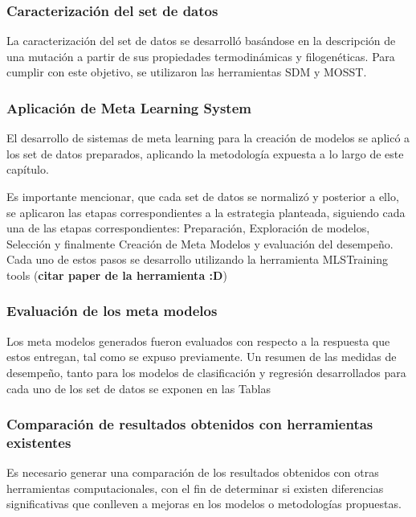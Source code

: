 \subsubsection{Caracterización del set de datos}

La caracterización del set de datos se desarrolló basándose en la descripción de una mutación a partir de sus propiedades termodinámicas y filogenéticas. Para cumplir con este objetivo, se utilizaron las herramientas SDM y MOSST.

\subsubsection{Aplicación de Meta Learning System}

El desarrollo de sistemas de meta learning para la creación de modelos se aplicó a los set de datos preparados, aplicando la metodología expuesta a lo largo de este capítulo.

Es importante mencionar, que cada set de datos se normalizó y posterior a ello, se aplicaron las etapas correspondientes a la estrategia planteada, siguiendo cada una de las etapas correspondientes: Preparación, Exploración de modelos, Selección y finalmente Creación de Meta Modelos y evaluación del desempeño. Cada uno de estos pasos se desarrollo utilizando la herramienta MLSTraining tools (\textbf{citar paper de la herramienta :D})

\subsubsection{Evaluación de los meta modelos}

Los meta modelos generados fueron evaluados con respecto a la respuesta que estos entregan, tal como se expuso previamente. Un resumen de las medidas de desempeño, tanto para los modelos de clasificación y regresión desarrollados para cada uno de los set de datos se exponen en las Tablas 

\subsubsection{Comparación de resultados obtenidos con herramientas existentes}

Es necesario generar una comparación de los resultados obtenidos con otras herramientas computacionales, con el fin de determinar si existen diferencias significativas que conlleven a mejoras en los modelos o metodologías propuestas.
 
